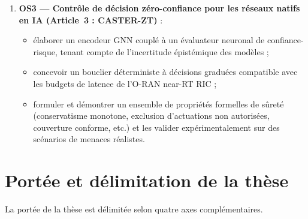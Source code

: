 \begin{enumerate}
  \item \textbf{OS3 — Contrôle de décision zéro-confiance pour les réseaux natifs en IA (Article~3 : CASTER-ZT)}\cite{rose2020nist,garcia2015saferl,pranger2025shields,ztaiot_acm2025} :
  \begin{itemize}
    \item élaborer un encodeur GNN couplé à un évaluateur neuronal de confiance-risque, tenant compte de l'incertitude épistémique des modèles ;
    \item concevoir un bouclier déterministe à décisions graduées compatible avec les budgets de latence de l'O-RAN near-RT RIC ;
    \item formuler et démontrer un ensemble de propriétés formelles de sûreté (conservatisme monotone, exclusion d'actuations non autorisées, couverture conforme, etc.) et les valider expérimentalement sur des scénarios de menaces réalistes.
  \end{itemize}
\end{enumerate}

\section{Portée et délimitation de la thèse}\label{sec:Portee}

La portée de la thèse est délimitée selon quatre axes complémentaires.

